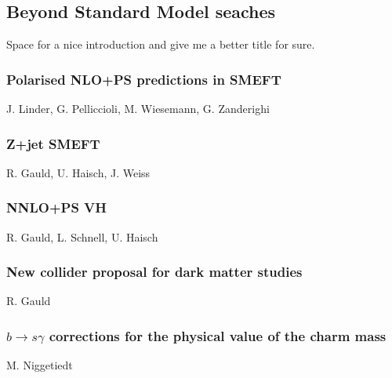 \documentclass{FBR_Bericht_2025}
\begin{document}
\subsection{Beyond Standard Model seaches}
\begin{refsection}
Space for a nice introduction and give me a better title for sure.
%
\subsubsection{Polarised NLO+PS predictions in SMEFT}
\begin{Namen}
J. Linder, G. Pelliccioli, M. Wiesemann, G. Zanderighi
\end{Namen}
%
\subsubsection{Z+jet SMEFT}
\begin{Namen}
R. Gauld, U. Haisch, J. Weiss
\end{Namen}
%
\subsubsection{NNLO+PS VH}
\begin{Namen}
R. Gauld, L. Schnell, U. Haisch
\end{Namen}
%
\subsubsection{New collider proposal for dark matter studies}
\begin{Namen}
R. Gauld
\end{Namen}
%
\subsubsection{$b\rightarrow s \gamma$ corrections for the physical value of the charm mass}
\begin{Namen}
M. Niggetiedt
\end{Namen}
%
\printbibliography[heading=subbibliography]
\end{refsection}


\clearpage
\onecolumn
\end{document}
